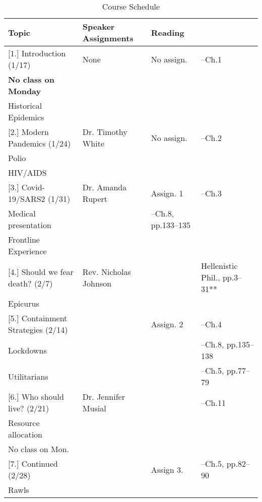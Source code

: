 \documentclass[article,oneside]{memoir}
\begin{document}
\newpage
\begin{landscape}
\begin{center}
\begin{longtable}{p{6cm}p{4cm}p{6cm}p{4cm}}
 
  \caption{Course Schedule} \\
  \toprule
  \textbf{Topic}   & \textbf{Speaker} \textbf{Assignments} & \textbf{Reading} \\
  \midrule

  
[1.] Introduction (1/17) 		& None				& No assign.		&  --Ch.1 \\ 
\textbf{No class on Monday}	&					&				&   \\
Historical Epidemics			&					&				& \\
[1.8\baselineskip] \hline


[2.] Modern Pandemics (1/24)	  & Dr. Timothy White 	 &  No assign.	& --Ch.2\\
Polio 					  &	 	&			 &  \\ 
HIV/AIDS					  &	 	& 	 		& \\ [1.8\baselineskip] \hline



[3.] Covid-19/SARS2 (1/31)	& Dr. Amanda Rupert 	& Assign. 1	& --Ch.3   \\ 
Medical presentation			&					& --Ch.8, pp.133--135 & \\ 
Frontline Experience			&					&  & \\[1.8\baselineskip]  \hline 

[4.] Should we fear death? (2/7) & Rev. Nicholas Johnson	 &     	 &  Hellenistic Phil., pp.3–31** \\
Epicurus					 & 					 & 	 &  \\ [1.8\baselineskip]  \hline %


[5.] Containment Strategies (2/14)	& 			& Assign. 2 	&  --Ch.4  \\
Lockdowns			    	    	& 			&			&  --Ch.8, pp.135--138  \\ 
Utilitarians		    	    			& 			&			&  --Ch.5, pp.77--79 \\  [1.8\baselineskip]  \hline 

[6.] Who should live?  (2/21)	   	&  Dr. Jennifer Musial		&      &  --Ch.11 \\
Resource allocation				&						&	&	 \\
No class on Mon.			     	& 						&	&  	 \\ [1.8\baselineskip]  \hline 

[7.] Continued (2/28)				& 			& Assign 3.		&  --Ch.5, pp.82--90 \\
Rawls						& 			&	  			& \\  [1.8\baselineskip]  \hline


\end{longtable}
\end{center}
\end{landscape}
\end{document}
